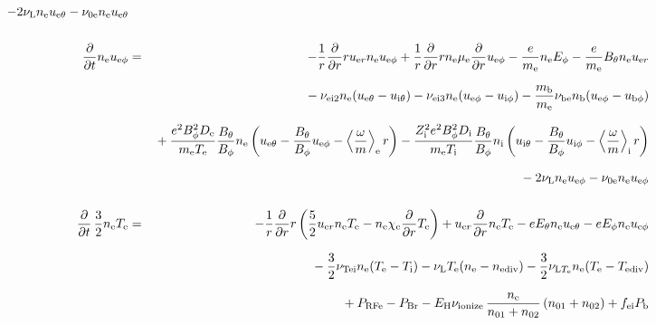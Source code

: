 \documentclass[11pt]{article}
\def\r#1{{\rm#1}}
\def\ddt{\frac{\partial}{\partial t}}
\def\ddr{\frac{\partial}{\partial r}}
\def\ave#1{\left\langle#1\right\rangle}
\def\me{m_\r{e}}
\def\mb{m_\r{b}}
\def\mue{\mu_\r{e}}
\def\mui{\mu_\r{i}}
\def\De{D_\r{e}}
\def\Di{D_\r{i}}
\def\chie{\chi_\r{e}}
\def\ne{n_\r{e}}
\def\ni{n_\r{i}}
\def\nb{n_\r{b}}
\def\uer{u_{\r{e}r}}
\def\ueth{u_{\r{e}\theta}}
\def\uith{u_{\r{i}\theta}}
\def\ueph{u_{\r{e}\phi}}
\def\uiph{u_{\r{i}\phi}}
\def\ubph{u_{\r{b}\phi}}
\def\Eth{E_\theta}
\def\Eph{E_\phi}
\def\Bth{B_\theta}
\def\Bph{B_\phi}
\def\Te{T_\r{e}}
\def\Ti{T_\r{i}}
\def\nna{n_{01}}
\def\nnb{n_{02}}
\def\Zi{Z_\r{i}}
\def\Pb{P_\r{b}}
\def\PRFe{P_\r{RFe}}
\def\PBr{P_\r{Br}}
\def\EH{E_\r{H}}
\def\fei{f_\r{ei}}
\def\nube{\nu_\r{be}}
\def\nune{\nu_\r{0e}}
\def\nuL{\nu_\r{L}}
\def\nuion{\nu_\r{ionize}}
\def\nuTei{\nu_\r{Tei}}
\def\vb{v_\r{b}}
\def\nediv{n_\r{ediv}}
\def\Tediv{T_\r{ediv}}
\def\nuLTe{\nu_{\r{L}T_\r{e}}}
\newcommand{\Frac}[2]{%
  {\displaystyle {\displaystyle #1\over \displaystyle #2}}%
}
\newcommand{\rdprd}[2]{\Frac{\partial #1}{\partial #2}}
\newcommand{\aveaveB}[1]{\left< \!\! \left< #1 \right> \!\! \right>}
\begin{document}
\begin{eqnarray}
%
%
  - 2 \nuL \ne \ueth
%
  - \nune \ne \ueth
%
%
\\[5mm]
%
%
  \ddt \ne \ueph &=&
%
  - \frac{1}{r} \ddr r \uer \ne \ueph
%
  + \frac{1}{r} \ddr r \ne \mue \ddr \ueph
%
  - \frac{e}{\me} \ne \Eph
%
  - \frac{e}{\me} \Bth \ne \uer 
\nonumber\\[2.5mm]&&{}
%
  - \nu_\r{ei2} \ne (\ueth - \uith)
%
  - \nu_\r{ei3} \ne (\ueph - \uiph)
%
  - \frac{\mb}{\me} \nube \nb (\ueph - \ubph)
\nonumber\\[2.5mm]&&{}
%
  + \frac{e^2 \Bph^2 \De}{\me\Te}\frac{\Bth}{\Bph}\ne
    \left(\ueth - \frac{\Bth}{\Bph}\ueph - \ave{\frac{\omega}{m}}_\r{e}
     r \right)
%
  - \frac{\Zi^2 e^2 \Bph^2 \Di}{\me\Ti}\frac{\Bth}{\Bph}\ni
    \left(\uith - \frac{\Bth}{\Bph}\uiph - \ave{\frac{\omega}{m}}_\r{i}
     r \right)
\nonumber\\[2.5mm]&&{}
%
  - 2 \nuL \ne \ueph
%
  - \nune \ne \ueph
%
%
\\[5mm]
%
%
  \ddt \, \frac{3}{2} \ne \Te &=&
%
 - \frac{1}{r} \ddr r
   \left( \frac{5}{2} \uer \ne \Te - \ne \chie \ddr \Te \right)
%
  +  \uer \ddr \ne \Te
%
  -  e \Eth \ne \ueth
%
  -  e \Eph \ne \ueph 
\nonumber\\[2.5mm]&&{}
%
  - \frac{3}{2} \nuTei \ne (\Te - \Ti)
%
%
  - \nuL \Te (\ne - \nediv)
%
  - \frac{3}{2} \nuLTe \ne (\Te - \Tediv)
\nonumber\\[2.5mm]&&{}
%
  + \PRFe
%
  - \PBr
%
  - \EH \nuion\, \frac{\ne}{\nna+\nnb}\, (\nna+\nnb)
%
  + \fei \Pb
\\[5mm]

\end{eqnarray}
\end{document}

